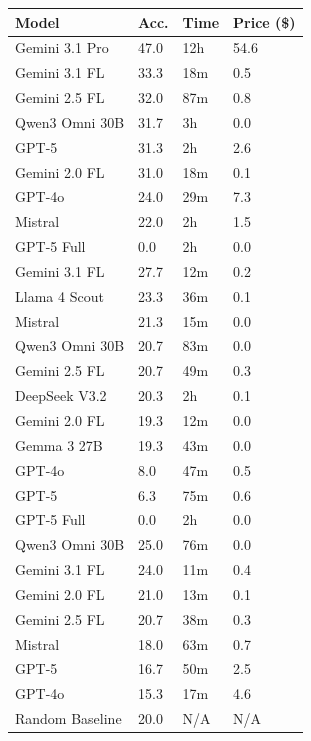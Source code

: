 \begin{tabular}{llll}
\toprule
Model & Acc. & Time & Price (\$) \\
\midrule
Gemini 3.1 Pro & 47.0 & 12h & 54.6 \\
Gemini 3.1 FL & 33.3 & 18m & 0.5 \\
Gemini 2.5 FL & 32.0 & 87m & 0.8 \\
Qwen3 Omni 30B & 31.7 & 3h & 0.0 \\
GPT-5 & 31.3 & 2h & 2.6 \\
Gemini 2.0 FL & 31.0 & 18m & 0.1 \\
GPT-4o & 24.0 & 29m & 7.3 \\
Mistral & 22.0 & 2h & 1.5 \\
GPT-5 Full & 0.0 & 2h & 0.0 \\
\midrule
Gemini 3.1 FL & 27.7 & 12m & 0.2 \\
Llama 4 Scout & 23.3 & 36m & 0.1 \\
Mistral & 21.3 & 15m & 0.0 \\
Qwen3 Omni 30B & 20.7 & 83m & 0.0 \\
Gemini 2.5 FL & 20.7 & 49m & 0.3 \\
DeepSeek V3.2 & 20.3 & 2h & 0.1 \\
Gemini 2.0 FL & 19.3 & 12m & 0.0 \\
Gemma 3 27B & 19.3 & 43m & 0.0 \\
GPT-4o & 8.0 & 47m & 0.5 \\
GPT-5 & 6.3 & 75m & 0.6 \\
GPT-5 Full & 0.0 & 2h & 0.0 \\
\midrule
Qwen3 Omni 30B & 25.0 & 76m & 0.0 \\
Gemini 3.1 FL & 24.0 & 11m & 0.4 \\
Gemini 2.0 FL & 21.0 & 13m & 0.1 \\
Gemini 2.5 FL & 20.7 & 38m & 0.3 \\
Mistral & 18.0 & 63m & 0.7 \\
GPT-5 & 16.7 & 50m & 2.5 \\
GPT-4o & 15.3 & 17m & 4.6 \\
\midrule
Random Baseline & 20.0 & N/A & N/A \\
\bottomrule
\end{tabular}
